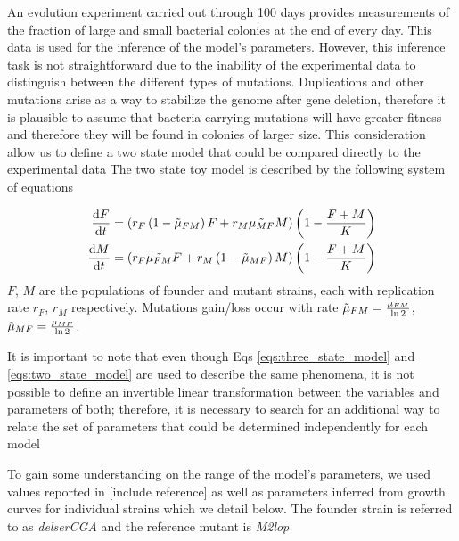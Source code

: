 \documentclass{article}
\begin{document}
An evolution experiment carried out through 100 days provides measurements of the fraction of large and small bacterial colonies at the end of every day. This data is used for the inference of the model's parameters. However, this inference task is not straightforward due to the inability of the experimental data to distinguish between the different types of mutations. 
Duplications and other mutations arise as a way to stabilize the genome after gene deletion, therefore it is plausible to assume that bacteria carrying mutations will have greater fitness and therefore they will be found in colonies of larger size. This consideration allow us to define a two state model that could be compared directly to the experimental data
The two state toy model is described by the following system of equations

\begin{subequations}\label{eqs:two_state_model}
\begin{align}
\dv{F}{t} &= \left( r_F\left(1 - \Tilde{\mu}_{FM}\right)F + r_M \Tilde{\mu_{MF}} M\right) \left(1-\frac{F + M}{K}\right)\\
\dv{M}{t} &= \left( r_F \Tilde{\mu_{FM}} F + r_M\left(1 - \Tilde{\mu}_{MF}\right)M\right) \left(1-\frac{F + M}{K}\right)
\end{align}
\end{subequations}
$F$, $M$ are the populations of founder and mutant strains, each with replication rate $r_F$, $r_M$ respectively. Mutations gain/loss occur with rate $\Tilde{\mu}_{FM} = \frac{\mu_{FM}}{\ln{2}}$, $\Tilde{\mu}_{MF} = \frac{\mu_{MF}}{\ln{2}}$.



It is important to note that even though Eqs \ref{eqs:three_state_model} and \ref{eqs:two_state_model} are used to describe the same phenomena, it is not possible to define an invertible linear transformation between the variables and parameters of both; therefore, it is necessary to search for an additional way to relate the set of parameters that could be determined independently for each model

To gain some understanding on the range of the model's parameters, we used values reported in [include reference] as well as parameters inferred from growth curves for individual strains which we detail below. The founder strain is referred to as \textit{delserCGA} and the reference mutant is \textit{M2lop}
\end{document}

